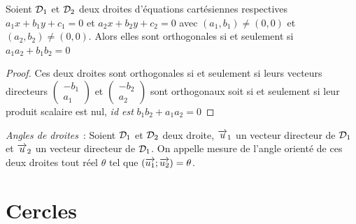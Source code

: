 \begin{prop}
  Soient $\mathcal{D}_1$ et $\mathcal{D}_2$ deux droites d'équations cartésiennes respectives $a_1x+b_1y+c_1=0$ et $a_2x+b_2y+c_2=0$ avec $(a_1,b_1) \neq (0,0)$ et $(a_2,b_2) \neq (0,0)$. Alors elles sont orthogonales si et seulement si $a_1 a_2 + b_1 b_2=0$
\end{prop}
\begin{proof}
  Ces deux droites sont orthogonales si et seulement si leurs vecteurs directeurs $\begin{pmatrix} -b_1 \\ a_1 \end{pmatrix}$ et $\begin{pmatrix} -b_2 \\ a_2 \end{pmatrix}$ sont orthogonaux soit si et seulement si leur produit scalaire est nul, \emph{id est} $b_1 b_2 + a_1 a_2=0$
\end{proof}

\emph{Angles de droites}~:
Soient $\mathcal{D}_1$ et $\mathcal{D}_2$ deux droite, $\overrightarrow{u}_1$ un vecteur directeur de $\mathcal{D}_1$ et $\overrightarrow{u}_2$ un vecteur directeur de $\mathcal{D}_1$. On appelle mesure de l'angle orienté de ces deux droites tout réel $\theta$ tel que $(\overrightarrow{u_1};\overrightarrow{u_2})=\theta$.

\section{Cercles}
\label{sec:cercle}
